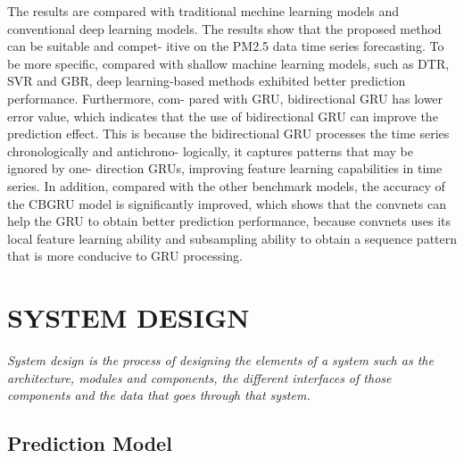 The results are compared with traditional mechine learning
models and conventional deep learning models. The results
show that the proposed method can be suitable and compet-
itive on the PM2.5 data time series forecasting. To be more
specific, compared with shallow machine learning models,
such as DTR, SVR and GBR, deep learning-based methods
exhibited better prediction performance. Furthermore, com-
pared with GRU, bidirectional GRU has lower error value,
which indicates that the use of bidirectional GRU can improve
the prediction effect. This is because the bidirectional GRU
processes the time series chronologically and antichrono-
logically, it captures patterns that may be ignored by one-
direction GRUs, improving feature learning capabilities in
time series. In addition, compared with the other benchmark
models, the accuracy of the CBGRU model is significantly
improved, which shows that the convnets can help the GRU to
obtain better prediction performance, because convnets uses
its local feature learning ability and subsampling ability to
obtain a sequence pattern that is more conducive to GRU
processing.



\chapter{SYSTEM DESIGN}  %

{\em System design is the process of designing the elements of a system such as the architecture,
modules and components, the different interfaces of those components and the data
that goes through that system. }

\section {Prediction Model}


